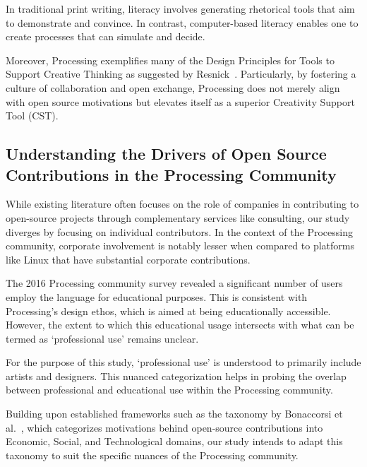 \documentclass[draft]{article}
\begin{document}
In traditional print writing, literacy involves generating rhetorical tools that aim to demonstrate and convince. In contrast, computer-based literacy enables one to create processes that can simulate and decide. %

Moreover, Processing exemplifies many of the Design Principles for Tools to Support Creative Thinking as suggested by Resnick~\parencite{resnickDesignPrinciplesTools}. Particularly, by fostering a culture of collaboration and open exchange, Processing does not merely align with open source motivations but elevates itself as a superior Creativity Support Tool (CST). %




\subsection{Understanding the Drivers of Open Source Contributions in the Processing Community}

While existing literature often focuses on the role of companies in contributing to open-source projects through complementary services like consulting, our study diverges by focusing on individual contributors. In the context of the Processing community, corporate involvement is notably lesser when compared to platforms like Linux that have substantial corporate contributions.

The 2016 Processing community survey revealed a significant number of users employ the language for educational purposes. This is consistent with Processing's design ethos, which is aimed at being educationally accessible. However, the extent to which this educational usage intersects with what can be termed as `professional use' remains unclear.

For the purpose of this study, `professional use' is understood to primarily include artists and designers. This nuanced categorization helps in probing the overlap between professional and educational use within the Processing community.

Building upon established frameworks such as the taxonomy by Bonaccorsi et al.~\cite{bonaccorsiComparingMotivationsIndividual2006}, which categorizes motivations behind open-source contributions into Economic, Social, and Technological domains, our study intends to adapt this taxonomy to suit the specific nuances of the Processing community.
\end{document}
